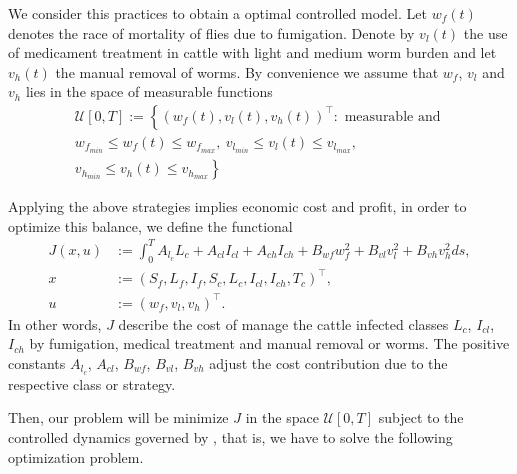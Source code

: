 \documentclass[preprint, 12pt]{elsarticle}
\begin{document}
        We consider this practices to obtain a optimal controlled model.
    Let $w_f(t)$ denotes the race of mortality of flies due to fumigation.
    Denote by $v_l(t)$ the use of medicament treatment in cattle with light and
    medium worm burden and let $v_h(t)$ the manual removal of worms. By
    convenience we  assume that $w_f$, $v_l$ and $v_h$ lies in the space of
    measurable functions
    \begin{multline}
        \mathcal{U}[0, T]
        :=
        \left\{ \right.
            (w_f(t),  v_l(t), v_h(t))^{\top}:
                    \text{ measurable and }
            \\
%
                w_{f_{min}} \leq w_f(t) \leq w_{f_{max}}, \
                v_{l_{min}} \leq v_l(t) \leq v_{l_{max}},
            \\
%
                v_{h_{min}} \leq v_h(t) \leq v_{h_{max}}
            \left. \right\}
    \end{multline}

        Applying the above strategies implies economic cost and profit, in
    order to optimize this balance, we define the functional
    \begin{equation}\label{eqn:cost_functional}
        \begin{aligned}
            J(x, u) &:=
                \int_0 ^T
                    A_{l_c} L_c
                    + A_{cl} I_{cl}
                    + A_{ch} I_{ch}
                    + B_{wf}  w_f ^ 2
                    + B_{vl}  v_l ^ 2
                    + B_{vh}  v_h ^ 2
                ds,
            \\
            x &:= (S_f, L_f, I_f, S_c, L_c, I_{cl}, I_{ch}, T_c)^{\top},
            \\
            u &:= (w_f, v_l, v_h)^{\top} .
        \end{aligned}
    \end{equation}
%
    In other words, $J$ describe the cost of manage the cattle infected
    classes $L_c$, $I_{cl}$, $I_{ch}$ by fumigation, medical treatment and
    manual removal or worms. The positive constants
    $A_{l_c}$, $A_{cl}$, $B_{wf}$, $B_{vl}$, $B_{vh}$ adjust the cost
    contribution due to the respective class or strategy.

        Then, our problem will be minimize $J$ in the space $\mathcal{U}[0,T]$
    subject to the controlled dynamics governed by
    , that is, we
    have to solve the following optimization problem.
\end{document}
